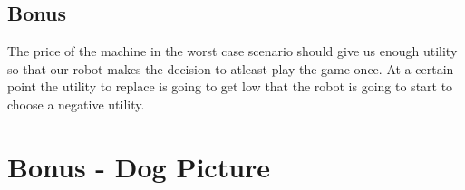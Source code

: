 \documentclass[11pt]{scrartcl} %
\begin{document}
\subsection{Bonus}
The price of the machine in the worst case scenario should give us enough utility so that our robot makes the decision to atleast play the game once. At a certain point the utility to replace is going to get low that the robot is going to start to choose a negative utility. 
\section{Bonus - Dog Picture}
\end{document}
